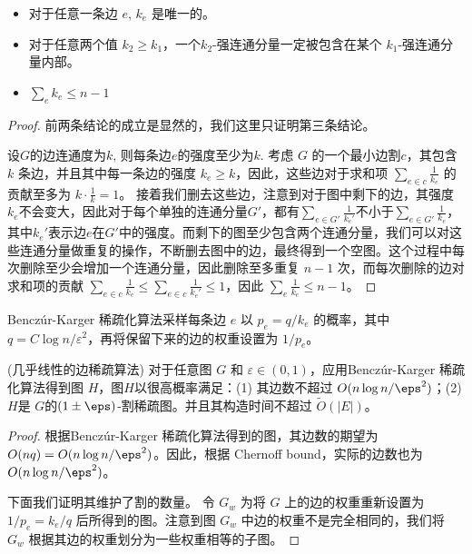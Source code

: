 \documentclass[lang=cn,newtx,10pt,scheme=chinese,chinesefont=nofont,citestyle=gb7714-2015, bibstyle=gb7714-2015]{elegantbook}
\begin{document}
\begin{refsection}
\begin{lemma}
    \begin{itemize}
        \item 对于任意一条边 $e$, $k_e$ 是唯一的。
        \item 对于任意两个值 $k_2\geq k_1$，一个$k_2$-强连通分量一定被包含在某个 $k_1$-强连通分量内部。
        \item $\sum_e k_e\leq n-1$
    \end{itemize}
\end{lemma}

\begin{proof}
    前两条结论的成立是显然的，我们这里只证明第三条结论。

       设$G$的边连通度为$k$, 则每条边$e$的强度至少为$k$. 考虑 $G$ 的一个最小边割$c$，其包含 $k$ 条边，并且其中每一条边的强度 $k_e\geq k$，因此，这些边对于求和项 $\sum_{e\in c}\frac{1}{k_e}$ 的贡献至多为 $k\cdot \frac{1}{k} = 1$。
    接着我们删去这些边，注意到对于图中剩下的边，其强度$k_e$不会变大，因此对于每个单独的连通分量$G'$，都有$\sum_{e\in G'}\frac{1}{k_e'}$不小于$\sum_{e\in G'}\frac{1}{k_e}$，其中$k_e'$表示边$e$在$G'$中的强度。而剩下的图至少包含两个连通分量，我们可以对这些连通分量做重复的操作，不断删去图中的边，最终得到一个空图。这个过程中每次删除至少会增加一个连通分量，因此删除至多重复 $n-1$ 次，而每次删除的边对求和项的贡献 $\sum_{e\in c}\frac{1}{k_e}\leq\sum_{e\in c}\frac{1}{k_e'}\leq1$，因此 $\sum_{e}\frac{1}{k_e} \leq n-1$。
\end{proof}

Benczúr-Karger 稀疏化算法采样每条边 $e$ 以 $p_e = q/k_e$ 的概率，其中  $q=C\log n/\varepsilon^2$，再将保留下来的边的权重设置为 $1/p_e$。

\begin{theorem}{(几乎线性的边稀疏算法)}
    对于任意图 $G$ 和 $\varepsilon\in(0,1)$，应用Benczúr-Karger 稀疏化算法得到图 $H$，图$H$以很高概率满足：(1) 其边数不超过 $O(n\log n /\eps^2)$；(2) $H$是 $G$的$(1\pm \eps)$-割稀疏图。并且其构造时间不超过 $\widetilde{O}(|E|)$。
\end{theorem}

\begin{proof}
    根据Benczúr-Karger 稀疏化算法得到的图，其边数的期望为 $O(nq) = O(n\log n/\eps^2)$。因此，根据 Chernoff bound，实际的边数也为 $O(n\log n/\eps^2)$。

    下面我们证明其维护了割的数量。
    令 $G_w$ 为将 $G$ 上的边的权重重新设置为 $1/p_e = k_e/q$ 后所得到的图。注意到图 $G_w$ 中边的权重不是完全相同的，我们将 $G_w$ 根据其边的权重划分为一些权重相等的子图。


\end{proof}
\end{refsection}
\end{document}
